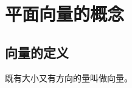 %
%
%    
%
%
%



\section{平面向量的概念}
\subsection{向量的定义}

\begin{definition}[向量]
既有大小又有方向的量叫做向量。
\end{definition}

